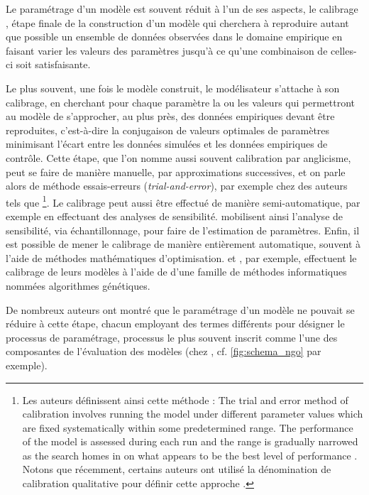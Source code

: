 Le paramétrage d'un modèle est souvent réduit à l'un de ses aspects, le \og calibrage \fg, étape finale de la construction d'un modèle qui cherchera à reproduire autant que possible un ensemble de données observées dans le domaine empirique en faisant varier les valeurs des paramètres jusqu'à ce qu'une combinaison de celles-ci soit satisfaisante.

Le plus souvent, une fois le modèle construit, le modélisateur s'attache à son \og calibrage\fg{}, en cherchant pour chaque paramètre la ou les valeurs qui permettront au modèle de s'approcher, au plus près, des données empiriques devant être reproduites, c'est-à-dire la conjugaison de \og valeurs optimales\fg{} de paramètres minimisant l'écart entre les données simulées et les données empiriques de contrôle.
Cette étape, que l'on nomme aussi souvent calibration par anglicisme, peut se faire de manière manuelle, par approximations successives, et on parle alors de  méthode \og essais-erreurs\fg{} (\textit{trial-and-error}), par exemple chez des auteurs tels que \textcite{batty_spatial_1973}\footnote{
	Les auteurs définissent ainsi cette méthode : \og
	The trial and error method of calibration involves running the model under different parameter values which are fixed systematically within some predetermined range.
	The performance of the model is assessed during each run and the range is gradually narrowed as the search homes in on what appears to be the best level of performance\fg{} \autocite[356]{batty_spatial_1973}.
	Notons que récemment, certains auteurs ont utilisé la dénomination de \og calibration qualitative\fg{} pour définir cette approche \autocite[253]{crooks_agent-based_2019}.
}.
Le calibrage peut aussi être effectué de manière semi-automatique, par exemple en effectuant des analyses de sensibilité.
\textcite[\S2.3--2.4]{thiele_facilitating_2014} mobilisent ainsi l'analyse de sensibilité, via échantillonnage, pour faire de l'estimation de paramètres.
Enfin, il est possible de mener le calibrage de manière entièrement automatique, souvent à l'aide de méthodes mathématiques d'optimisation.
\textcite{heppenstall_genetic_2007} et \textcite[188]{ngo_calibration_2012}, par exemple, effectuent le calibrage de leurs modèles à l'aide de d'une famille de méthodes informatiques nommées \og algorithmes génétiques\fg{}.

De nombreux auteurs ont montré que le paramétrage d'un modèle ne pouvait se réduire à cette étape, chacun employant des termes différents pour désigner le processus de paramétrage, processus le plus souvent inscrit comme l'une des composantes de l'évaluation des modèles (chez \textcite{ngo_calibration_2012}, cf. \cref{fig:schema_ngo} par exemple).

